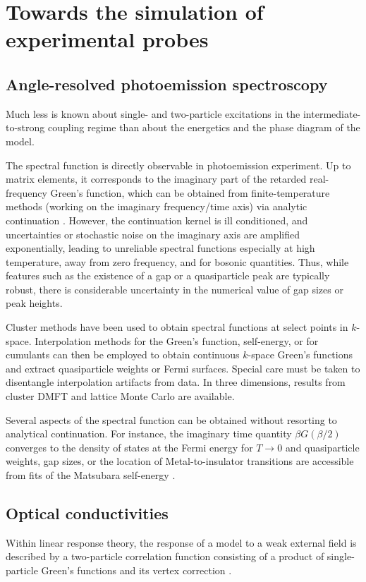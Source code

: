 \documentclass{ar-1col}
\begin{document}
\section{Towards the simulation of experimental probes}
\label{sec:experimental}
\subsection{Angle-resolved photoemission spectroscopy}
Much less is known about single- and two-particle excitations in the intermediate-to-strong coupling regime than about the energetics and the phase diagram of the model.

The spectral function is directly observable in photoemission experiment. Up to matrix elements, it corresponds to the imaginary part of the retarded real-frequency Green's function, which can be obtained from finite-temperature methods (working on the imaginary frequency/time axis) via analytic continuation \cite{Jarrell96,Fei21}. However, the continuation kernel is ill conditioned, and uncertainties or stochastic noise on the imaginary axis are amplified exponentially, leading to unreliable spectral functions especially at high temperature, away from zero frequency, and for bosonic quantities.
Thus, while features such as the existence of a gap or a quasiparticle peak are typically robust, there is considerable uncertainty in the numerical value of gap sizes or peak heights.

Cluster methods \cite{Maier05A} have been used to obtain spectral functions at select points in $k$-space. Interpolation methods for the Green's function, self-energy, or for cumulants \cite{Stanescu06} can then be employed to obtain continuous $k$-space Green's functions and extract quasiparticle weights or Fermi surfaces. Special care must be taken to disentangle interpolation artifacts from data. In three dimensions, results from cluster DMFT \cite{Fuchs11B} and lattice Monte Carlo \cite{Ulmke96} are available.

Several aspects of the spectral function can be obtained without resorting to analytical continuation. For instance, the imaginary time quantity $\beta G(\beta/2)$ converges to the density of states at the Fermi energy for $T\rightarrow0$ \cite{Trivedi95} and quasiparticle weights, gap sizes, or the location of Metal-to-insulator transitions are accessible from fits of the Matsubara self-energy \cite{Gull10,Georges96}.

\subsection{Optical conductivities}
Within linear response theory, the response of a model to a weak external field is described by a two-particle correlation function consisting of a product of single-particle Green's functions and its vertex correction \cite{Rohringer12}.
\end{document}
